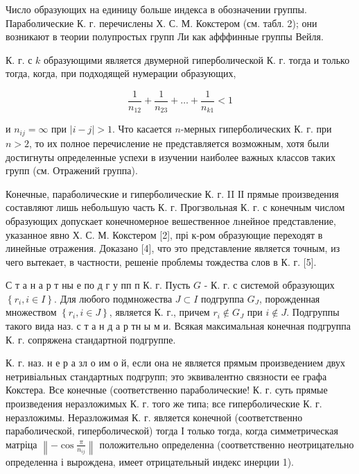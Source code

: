 \documentclass[10pt]{article}
\begin{document}
Число образующих на единицу больше индекса в обозначении группы. Параболические К. г. перечислены Х. С. М. Кокстером (см. табл. 2); они возникают в теории полупростых групп Ли как афффинные группы Вейля.



К. г. с $k$ образующими является двумерной гиперболической К. г. тогда и только тогда, когда, при подходящей нумерации образующих,



\[

\frac{1}{n_{12}}+\frac{1}{n_{23}}+\ldots+\frac{1}{n_{k 1}}<1

\]



и $n_{i j}=\infty$ при $|i-j|>1$. Что касается $n$-мерных гиперболических К. г. при $n>2$, то их полное перечисление не представляется возможным, хотя были достигнуты определенные успехи в изучении наиболее важных классов таких групп (см. Отражений группа).



Конечные, параболические и гиперболические К. г. II ІІ прямые произведения составляют лишь небольшую часть К. г. Прогзвольная К. г. с конечным числом образующих допускает конечномерное вешественное лıнейное представление, указанное явно Х. С. М. Кокстером [2], прі к-ром образующие переходят в линейные отражения. Доказано [4], что это представление является точным, из чего вытекает, в частности, решеніе проблемы тождества слов в К. г. [5].



С т а н а р т ны е по д г у пп п К. г. Пусть $G$ - К. г. с системой образующих $\left\{r_{i}, i \in I\right\}$. Для любого подмножества $J \subset I$ подгруппа $G_{J}$, порожденная множеством $\left\{r_{i}, i \in J\right\}$, является К. г., причем $r_{i} \notin G_{J}$ при $i \notin J$. Подгруппы такого вида наз. с т а н д а р тн ы м и. Всякая максимальная конечная подгруппа К. г. сопряжена стандартной подгруппе.



К. г. наз. н е р а зл о им о й, если она не является прямым произведением двух нетривіальных стандартных подгрупп; это эквивалентно связности ее графа Кокстера. Все конечные (соответственно параболические! К. г. суть прямые произведения неразложимых К. г. того же типа; все гиперболические К. г. неразложимы. Неразложимая К. г. является конечной (соответственно параболической, гиперболической) тогда І только тогда, когда симметрическая матріца $\left\|-\cos \frac{\pi}{n_{i j}}\right\|$ положительно определенна (соответственно неотрицательно определенна і вырождена, имеет отрицательный индекс инерции 1).
\end{document}
